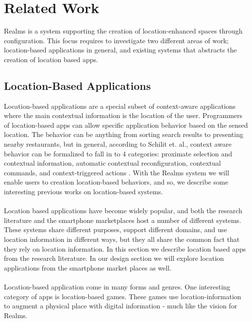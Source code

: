 \section{Related Work} %
\label{sec:related_work}
Realms is a system supporting the creation of location-enhanced spaces through configuration. This focus requires to investigate two different areas of work; location-based applications in general, and existing systems that abstracts the creation of location based apps.

\subsection{Location-Based Applications} %
\label{sub:agumented_spaces}
Location-based applications are a special subset of context-aware applications where the main contextual information is the location of the user. Programmers of location-based apps can allow specific application behavior based on the sensed location. The behavior can be anything from sorting search results to presenting nearby restaurants, but in general, according to Schilit et. al., context aware behavior can be formalized to fall in to 4 categories: proximate selection and contextual information, automatic contextual reconfiguration, contextual commands, and context-triggered actions \cite{512740}. With the Realms system we will enable users to creation location-based behaviors, and so, we describe some interesting previous works on location-based systems.
\\\\
Location based applications have become widely popular, and both the research literature and the smartphone marketplaces host a number of different systems. These systems share different purposes, support different domains, and use location information in different ways, but they all share the common fact that they rely on location information. In this section we describe location based apps from the research literature. In our design section we will explore location applications from the smartphone market places as well.
\\\\
Location-based application come in many forms and genres. One interesting category of apps is location-based games. These games use location-information to augment a physical place with digital information - much like the vision for Realms. 

